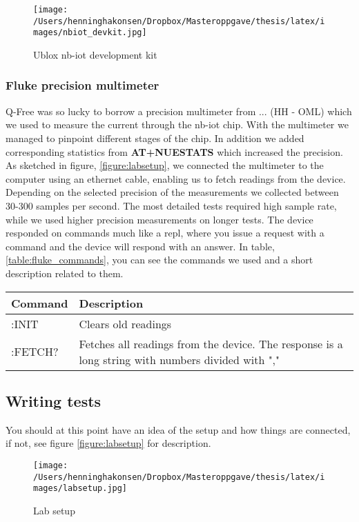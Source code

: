 \documentclass[USenglish]{ifimaster}  %
\begin{document}
\begin{figure}[ht]
  \centering\texttt{[image: /Users/henninghakonsen/Dropbox/Masteroppgave/thesis/latex/images/nbiot\_devkit.jpg]}
  \caption{Ublox \acrshort{nb-iot} development kit}
  \label{pic:nbiotdevkit}
\end{figure}

\subsubsection{Fluke precision multimeter}
Q-Free was so lucky to borrow a precision multimeter from ... (HH - OML) which we used to measure the current through the \acrshort{nb-iot} chip. With the multimeter we managed to pinpoint different stages of the chip. In addition we added corresponding statistics from \textbf{AT+NUESTATS} which increased the precision. As sketched in figure, \vref{figure:labsetup}, we connected the multimeter to the computer using an ethernet cable, enabling us to fetch readings from the device. Depending on the selected precision of the measurements we collected between 30-300 samples per second. The most detailed tests required high sample rate, while we used higher precision measurements on longer tests. The device responded on commands much like a \acrfull{repl}, where you issue a request with a command and the device will respond with an answer. In table, \vref{table:fluke_commands}, you can see the commands we used and a short description related to them.

\begin{center} \label{table:fluke_commands}
  \begin{tabular}{ | l | m{10cm} | }
    \hline
    Command & Description \\
    \hline
    :INIT & Clears old readings \\
    \hline
    :FETCH? & Fetches all readings from the device. The response is a long string with numbers divided with "," \\
    \hline
  \end{tabular}
\end{center}

\subsection{Writing tests}
You should at this point have an idea of the setup and how things are connected, if not, see figure \vref{figure:labsetup} for description.

\begin{figure}[ht]
  \centering\texttt{[image: /Users/henninghakonsen/Dropbox/Masteroppgave/thesis/latex/images/labsetup.jpg]}
  \caption{Lab setup \cite{pcpng35052:online} \cite{fluke88435:online} \cite{ingagrue31:online}}
  \label{figure:labsetup}
\end{figure}
\end{document}
